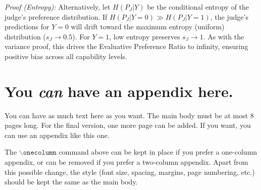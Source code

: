\documentclass{article}
\theoremstyle{plain}
\theoremstyle{definition}
\theoremstyle{remark}
\begin{document}
\textit{Proof (Entropy):} Alternatively, let $H(P_J | Y)$ be the conditional entropy of the judge's preference distribution. If $H(P_J | Y=0) \gg H(P_J | Y=1)$, the judge's predictions for $Y=0$ will drift toward the maximum entropy (uniform) distribution ($s_J \rightarrow 0.5$). For $Y=1$, low entropy preserves $s_J \rightarrow 1$. As with the variance proof, this drives the Evaluative Preference Ratio to infinity, ensuring positive bias across all capability levels.

\section{You \emph{can} have an appendix here.}

You can have as much text here as you want. The main body must be at most $8$
pages long. For the final version, one more page can be added. If you want, you
can use an appendix like this one.

The $\mathtt{\backslash onecolumn}$ command above can be kept in place if you
prefer a one-column appendix, or can be removed if you prefer a two-column
appendix.  Apart from this possible change, the style (font size, spacing,
margins, page numbering, etc.) should be kept the same as the main body.
\end{document}
